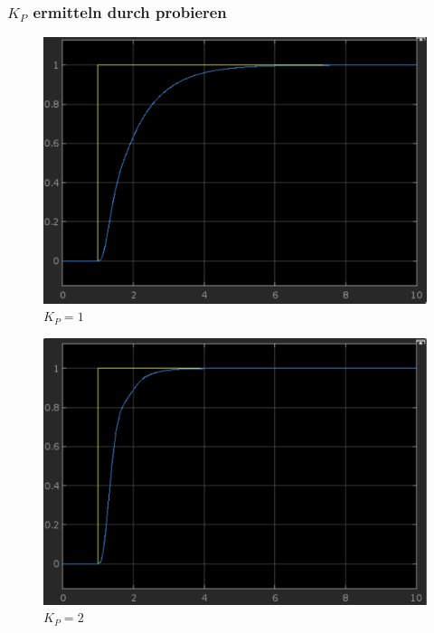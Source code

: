\documentclass{article}
\begin{document}
			\subsubsection{$K_P$ ermitteln durch probieren}
				\begin{figure}[h]
					\includegraphics[scale=0.225, center]{2_c_KP_1.png}
					\caption{$K_P = 1$}
					\label{fig16: Graph_c_KP_1}
				\end{figure}				
\newpage
				\begin{figure}[h]
					\includegraphics[scale=0.225, center]{2_c_KP_2.png}
					\caption{$K_P = 2$}
					\label{fig17: Graph_c_KP_2}
				\end{figure}				
\end{document}
